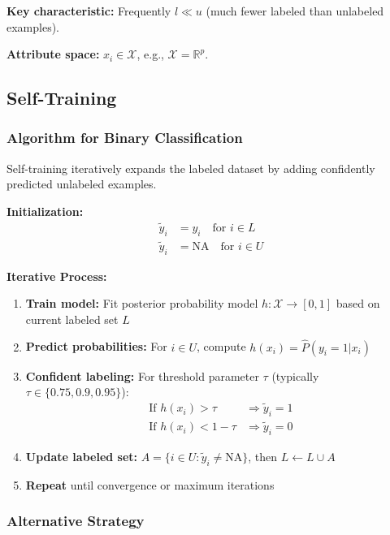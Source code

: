\documentclass[12pt,a4paper]{article}
\begin{document}
\textbf{Key characteristic:} Frequently $l \ll u$ (much fewer labeled than unlabeled examples).

\textbf{Attribute space:} $x_i \in \mathcal{X}$, e.g., $\mathcal{X} = \mathbb{R}^p$.

\subsection{Self-Training}

\subsubsection{Algorithm for Binary Classification}

Self-training iteratively expands the labeled dataset by adding confidently predicted unlabeled examples.

\textbf{Initialization:}
\begin{align}
\tilde{y}_i &= y_i \quad \text{for } i \in L \\
\tilde{y}_i &= \text{NA} \quad \text{for } i \in U
\end{align}

\textbf{Iterative Process:}
\begin{enumerate}
    \item \textbf{Train model:} Fit posterior probability model $h : \mathcal{X} \to [0,1]$ based on current labeled set $L$
    \item \textbf{Predict probabilities:} For $i \in U$, compute $h(x_i) = \hat{P}(y_i = 1|x_i)$
    \item \textbf{Confident labeling:} For threshold parameter $\tau$ (typically $\tau \in \{0.75, 0.9, 0.95\}$):
    \begin{align}
    \text{If } h(x_i) > \tau &\Rightarrow \tilde{y}_i = 1 \\
    \text{If } h(x_i) < 1-\tau &\Rightarrow \tilde{y}_i = 0
    \end{align}
    \item \textbf{Update labeled set:} $A = \{i \in U : \tilde{y}_i \neq \text{NA}\}$, then $L \leftarrow L \cup A$
    \item \textbf{Repeat} until convergence or maximum iterations
\end{enumerate}

\subsubsection{Alternative Strategy}
\end{document}
